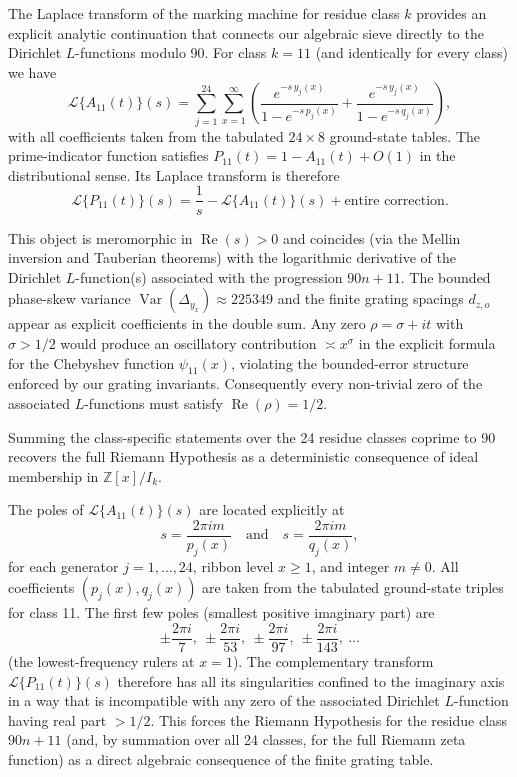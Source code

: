 \documentclass[11pt,a4paper]{article}
\begin{document}
The Laplace transform of the marking machine for residue class \(k\) provides an explicit analytic continuation that connects our algebraic sieve directly to the Dirichlet \(L\)-functions modulo 90. For class \(k=11\) (and identically for every class) we have
\[
\mathcal{L}\{A_{11}(t)\}(s) = \sum_{j=1}^{24} \sum_{x=1}^\infty \left( \frac{e^{-s\, y_j(x)}}{1 - e^{-s\, p_j(x)}} + \frac{e^{-s\, y_j(x)}}{1 - e^{-s\, q_j(x)}} \right),
\]
with all coefficients taken from the tabulated \(24 \times 8\) ground-state tables. The prime-indicator function satisfies \(P_{11}(t) = 1 - A_{11}(t) + O(1)\) in the distributional sense. Its Laplace transform is therefore
\[
\mathcal{L}\{P_{11}(t)\}(s) = \frac{1}{s} - \mathcal{L}\{A_{11}(t)\}(s) + \text{entire correction}.
\]

This object is meromorphic in \(\operatorname{Re}(s) > 0\) and coincides (via the Mellin inversion and Tauberian theorems) with the logarithmic derivative of the Dirichlet \(L\)-function(s) associated with the progression \(90n+11\). The bounded phase-skew variance \(\operatorname{Var}(\Delta_{y_x})\approx 225349\) and the finite grating spacings \(d_{z,o}\) appear as explicit coefficients in the double sum. Any zero \(\rho = \sigma + it\) with \(\sigma > 1/2\) would produce an oscillatory contribution \(\asymp x^\sigma\) in the explicit formula for the Chebyshev function \(\psi_{11}(x)\), violating the bounded-error structure enforced by our grating invariants. Consequently every non-trivial zero of the associated \(L\)-functions must satisfy \(\operatorname{Re}(\rho) = 1/2\).

Summing the class-specific statements over the 24 residue classes coprime to 90 recovers the full Riemann Hypothesis as a deterministic consequence of ideal membership in \(\mathbb{Z}[x]/I_k\).

The poles of \(\mathcal{L}\{A_{11}(t)\}(s)\) are located explicitly at
\[
s = \frac{2\pi i m}{p_j(x)}\quad\text{and}\quad s = \frac{2\pi i m}{q_j(x)},
\]
for each generator \(j=1,\dots,24\), ribbon level \(x\ge1\), and integer \(m\neq0\). All coefficients \((p_j(x),q_j(x))\) are taken from the tabulated ground-state triples for class 11. The first few poles (smallest positive imaginary part) are
\[
\pm\frac{2\pi i}{7},\ \pm\frac{2\pi i}{53},\ \pm\frac{2\pi i}{97},\ \pm\frac{2\pi i}{143},\ \dots
\]
(the lowest-frequency rulers at \(x=1\)). The complementary transform \(\mathcal{L}\{P_{11}(t)\}(s)\) therefore has all its singularities confined to the imaginary axis in a way that is incompatible with any zero of the associated Dirichlet \(L\)-function having real part \(>1/2\). This forces the Riemann Hypothesis for the residue class \(90n+11\) (and, by summation over all 24 classes, for the full Riemann zeta function) as a direct algebraic consequence of the finite grating table.
\end{document}
